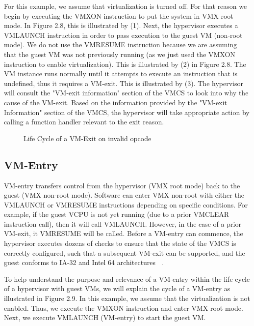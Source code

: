 \documentclass{report}
\begin{document}
\begin{spacing}{1.5}
{\large
\noindent For this example, we assume that virtualization is turned off. For that reason we begin by executing the VMXON instruction to put the system in VMX root mode. In Figure 2.8, this is illustrated by (1). Next, the hypervisor executes a VMLAUNCH instruction in order to pass execution to the guest VM (non-root mode). We do not use the VMRESUME instruction because we are assuming that the guest VM was not previously running (as we just used the VMXON instruction to enable virtualization). This is illustrated by (2) in Figure 2.8. The VM instance runs normally until it attempts to execute an instruction that is undefined, thus it requires a VM-exit. This is illustrated by (3). The hypervisor will consult the "VM-exit information" section of the VMCS to look into why the cause of the VM-exit. Based on the information provided by the "VM-exit Information" section of the VMCS, the hypervisor will take appropriate action by calling a function handler relevant to the exit reason.
\newline
}




{}
\begin{figure}[ht]
    \centering
    \caption{Life Cycle of a VM-Exit on invalid opcode}
\end{figure}



\subsection{VM-Entry}
{\large
VM-entry transfers control from the hypervisor (VMX root mode) back to the guest (VMX non-root mode). Software can enter VMX non-root with either the VMLAUNCH or VMRESUME instructions depending on specific conditions. For example, if the guest VCPU is not yet running (due to a prior VMCLEAR instruction call), then it will call VMLAUNCH. However, in the case of a prior VM-exit, it VMRESUME will be called. Before a VM-entry can commence, the hypervisor executes dozens of checks to ensure that the state of the VMCS is correctly configured, such that a subsequent VM-exit can be supported, and the guest conforms to IA-32 and Intel 64 architectures ~\cite{goto2011kernel}.
\newline
}

{\large
To help understand the purpose and relevance of a VM-entry within the life cycle of a hypervisor with guest VMs, we will explain the cycle of a VM-entry as illustrated in Figure 2.9. In this example, we assume that the virtualization is not enabled. Thus, we execute the VMXON instruction and enter VMX root mode. Next, we execute VMLAUNCH (VM-entry) to start the guest VM.
\newline
}




\end{spacing}
\end{document}
